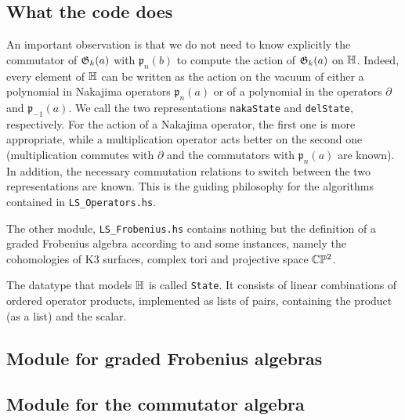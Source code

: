 \subsection{What the code does}
An important observation is that we do not need to know explicitly the commutator of $\mathfrak{G}_k(a)$ with $\mathfrak p_n(b)$ to compute the action of $\mathfrak{G}_k(a)$ on $\mathbb{H}$. 
Indeed, every element of $\mathbb{H}$ can be written as the action on the vacuum of either a polynomial in Nakajima operators $\mathfrak p_n(a)$ or of a polynomial in the operators $\partial$ and $\mathfrak p_{-1}(a)$. We call the two representations \verb|nakaState| and \verb|delState|, respectively. For the action of a Nakajima operator, the first one is more appropriate, while a multiplication operator acts better on the second one (multiplication commutes with $\partial$ and the commutators with $\mathfrak p_n(a)$ are known). 
In addition, the necessary commutation relations to switch between the two representations are known. This is the guiding philosophy for the algorithms contained in \verb|LS_Operators.hs|.

The other module, \verb|LS_Frobenius.hs| contains nothing but the definition of a graded Frobenius algebra according to \cite[Section 2.1]{LehnSorger} and some instances, namely the cohomologies of K3 surfaces, complex tori and projective space $\mathbb{C}\mathbb P^2$.

The datatype that models $\mathbb{H}$ is called \verb|State|. It consists of linear combinations of ordered operator products, implemented as lists of pairs, containing the product (as a list) and the scalar. 

\subsection{Module for graded Frobenius algebras} 

\subsection{Module for the commutator algebra} 

